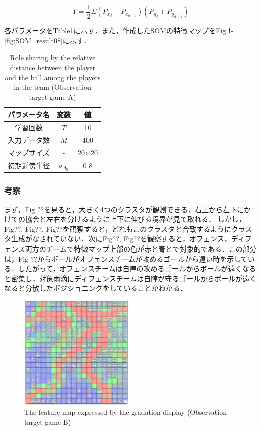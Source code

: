 \begin{equation}
	\label{11}
	Y = \frac{1}{2}\Sigma(P_{x_d}-P_{x_{d+1}})(P_{y_d}+P_{y_{d+1}})
\end{equation}

各パラメータをTable\ref{table4}に示す．また，作成したSOMの特徴マップをFig.\ref{fig:SOM_result05}-\ref{fig:SOM_result08}に示す．

\begin{table}[t]
	\begin{center}
	\caption{Role sharing by the relative distance between the player and the ball among the players in the team (Observation target game A)}
	\begin{tabular}{|c|c|c|}\hline
		\label{table4}
	 	パラメータ名 & 変数 & 値  \\ \hline \hline
	 	学習回数 & $T$ & 10  \\
   	 	入力データ数 & $M$ & 400 \\
		マップサイズ & - &20×20\\
   		初期近傍半径 & $\sigma_{\Lambda_0}$ & 0.8 \\ \hline
	\end{tabular}
	\end{center}
\end{table}

\subsubsection{考察}
まず，Fig ??を見ると，大きく4つのクラスタが観測できる．右上から左下にかけての協会と左右を分けるように上下に伸びる境界が見て取れる．
しかし，Fig??, Fig??, Fig??を観察すると，どれもこのクラスタと合致するようにクラスタ生成がなされていない．次にFig??, Fig??を観察すると，オフェンス，ディフェンス両方のチームで特徴マップ上部の色が赤と青とで対象的である．この部分は，Fig ??からボールがオフェンスチームが攻めるゴールから遠い時を示している．したがって，オフェンスチームは自陣の攻めるゴールからボールが遠くなると密集し，対象雨滴にディフェンスチームは自陣が守るゴールからボールが遠くなると分散したポジショニングをしていることがわかる．

\clearpage %

\begin{figure}[htb]
  \begin{center}
      \includegraphics[clip,height=5.5cm]{figure/The_feature_map_expressed_by_the_gradation_display_Observation_target_game_B_2.eps}
    \caption{The feature map expressed by the gradation display (Observation target game B)}
    \label{fig:SOM_result05}
\end{center}
\end{figure}

